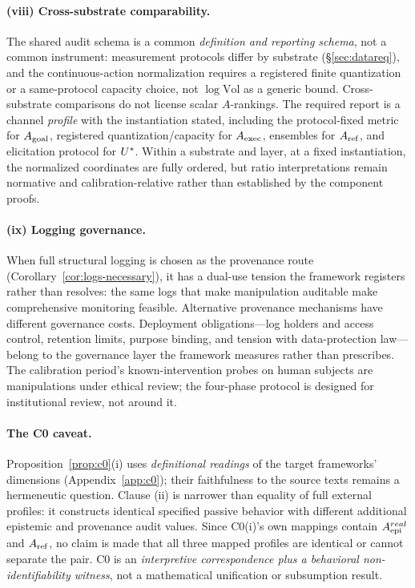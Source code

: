 \paragraph{(viii) Cross-substrate comparability.} The shared audit schema is
a common \emph{definition and reporting schema}, not a common instrument:
measurement
protocols differ by substrate (\S\ref{sec:datareq}), and the continuous-action
normalization requires a registered finite quantization or a same-protocol
capacity choice, not $\log\mathrm{Vol}$ as a generic bound. Cross-substrate
comparisons do not license scalar $A$-rankings. The required report is a
channel \emph{profile} with the instantiation stated, including the
protocol-fixed metric for $A_{\mathrm{goal}}$, registered quantization/capacity for
$A_{\mathrm{exec}}$, ensembles for $A_{\mathrm{ref}}$, and elicitation protocol for $U^{*}$.
Within a substrate and layer, at a fixed instantiation, the normalized
coordinates are fully ordered, but ratio interpretations remain normative and
calibration-relative rather than established by the component proofs.

\paragraph{(ix) Logging governance.} When full structural logging is chosen
as the provenance route (Corollary~\ref{cor:logs-necessary}), it has a
dual-use tension the framework registers rather than resolves: the same logs
that make manipulation auditable make comprehensive monitoring feasible.
Alternative provenance mechanisms have different governance costs.
Deployment obligations---log holders and access control, retention limits,
purpose binding, and tension with data-protection law---belong to the
governance layer the framework measures rather than prescribes. The
calibration period's known-intervention probes on human subjects are
manipulations under ethical review; the four-phase protocol is designed for
institutional review, not around it.

\paragraph{The C0 caveat.} Proposition~\ref{prop:c0}(i) uses
\emph{definitional readings} of the target frameworks' dimensions
(Appendix~\ref{app:c0}); their faithfulness to the source texts remains a
hermeneutic question. Clause (ii) is narrower than equality of full external
profiles: it constructs identical specified passive behavior with different
additional epistemic and provenance audit values. Since C0(i)'s own mappings
contain $A_{\mathrm{epi}}^{real}$ and $A_{\mathrm{ref}}$, no claim is made that all three mapped
profiles are identical or cannot separate the pair. C0 is an
\emph{interpretive correspondence plus a behavioral non-identifiability
witness}, not a mathematical unification or subsumption result.

